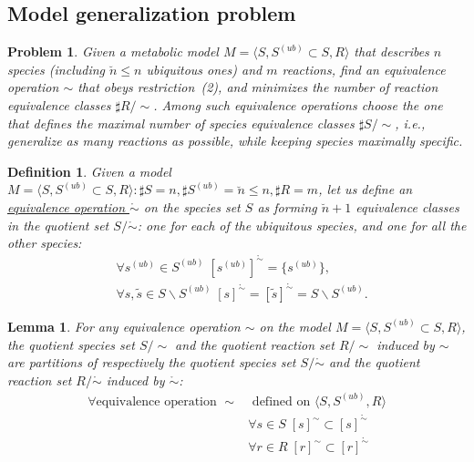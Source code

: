 \documentclass[10pt]{bmc_article}
\newenvironment{bmcformat}{\baselineskip20pt\sloppy\setboolean{publ}{false}}{\baselineskip20pt\sloppy}
\begin{document}
\begin{bmcformat}
\subsection*{Model generalization problem}
\newtheorem{p0}[pbm]{Problem}
\begin{p0}
Given a metabolic model $M=\langle S, S^{(ub)} \subset S, R \rangle$ that describes $n$ species (including $\breve{n} \leq n$ ubiquitous ones) and $m$ reactions, find an equivalence operation $\sim$ that obeys restriction~(2), and minimizes the number of reaction equivalence classes $\sharp R/\sim$. Among such equivalence operations choose the one that defines the maximal number of species equivalence classes $\sharp S/\sim$, i.e., generalize as many reactions as possible, while keeping species maximally specific.
\end{p0}
\newtheorem{eq0}[def]{Definition}\label{equiv0}
\begin{eq0}
Given a model $M=\langle S, S^{(ub)}\subset{S}, R \rangle : \sharp S = n, \sharp S^{(ub)}=\breve{n} \leq n, \sharp R = m$, let us define an \underline{equivalence operation $\mathring{\sim}$} on the species set $S$ as forming $\breve{n} + 1$ equivalence classes in the quotient set $S/\mathring{\sim}$: one for each of the ubiquitous species, and one for all the other species:
\begin{align*}
&\forall s^{(ub)} \in S^{(ub)} \;[s^{(ub)}]^{\mathring{\sim}} = \{s^{(ub)}\}, \\
&\forall s, \tilde{s} \in S\backslash S^{(ub)} \;[s]^{\mathring{\sim} } = [\tilde{s}]^{\mathring{\sim} } = S \backslash S^{(ub)}.
\end{align*}
\end{eq0}
\newtheorem{l1}[lm]{Lemma}
\begin{l1}
For any equivalence operation $\sim$ on the model $M=\langle S, S^{(ub)} \subset S, R \rangle$, the quotient species set $S/\sim$ and the quotient reaction set $R/\sim$ induced by $\sim$ are partitions of respectively the quotient species set $S/\mathring{\sim}$ and the quotient reaction set $R/\mathring{\sim} $ induced by $\mathring{\sim}$:
\begin{align*}
\forall \text{equivalence operation } \sim &\text{ defined on }\langle S, S^{(ub)}, R \rangle\\
&\forall s \in S \; [s]^{\sim} \subset [s]^{\mathring{\sim}} \\
&\forall r \in R \; [r]^{\sim} \subset [r]^{\mathring{\sim}} 
\end{align*}
\end{l1}


\end{bmcformat}
\end{document}
